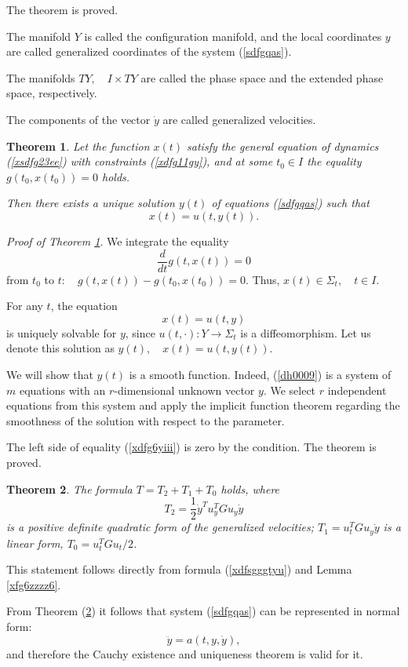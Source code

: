 \documentclass[reqno,12pt]{amsproc}
\newtheorem{theo}{Theorem}
\begin{document}
The theorem is proved.

The manifold $Y$ is called the configuration manifold, and the local coordinates $y$ are called generalized coordinates of the system (\ref{sdfgqas}).

The manifolds $TY,\quad I\times TY$ are called the phase space and the extended phase space, respectively.

The components of the vector $\dot y$ are called generalized velocities.




\begin{theo}\label{dfb00dd}
Let the function $x(t)$ satisfy the general equation of dynamics (\ref{xsdfg23ee}) with constraints (\ref{xdfg11gy}), and at some $t_0\in I$ the equality
$g(t_0,x(t_0))=0$ holds.

Then there exists a unique solution $y(t)$ of equations (\ref{sdfgqas}) such that $$x(t)=u(t,y(t)).$$\end{theo}
{\it Proof of Theorem \ref{dfb00dd}}.
We integrate the equality $$\frac{d}{dt}g(t,x(t))=0$$ from $t_0$ to $t:\quad g(t,x(t))-g(t_0,x(t_0))=0.$
Thus, $x(t)\in \Sigma_t,\quad t\in I$.

For any $t$, the equation \begin{equation}\label{dh0009}x(t)=u(t,y)\end{equation} is uniquely solvable for $y$, since $u(t,\cdot):Y\to\Sigma_t$ is a diffeomorphism. Let us denote this solution as $y(t),\quad x(t)=u(t,y(t))$.

We will show that $y(t)$ is a smooth function. Indeed, (\ref{dh0009}) is a system of $m$ equations with an $r$-dimensional unknown vector $y$. We select $r$ independent equations from this system and apply the implicit function theorem regarding the smoothness of the solution with respect to the parameter.


The left side of equality (\ref{xdfg6yiii}) is zero by the condition.
The theorem is proved.



\begin{theo}\label{asdf4eew}The formula
$T=T_2+T_1+T_0$ holds, where $$T_2=\frac{1}{2}\dot y^Tu_y^TGu_y\dot y$$ is a positive definite quadratic form of the generalized velocities; $T_1=u_t^TGu_y\dot y$ is a linear form, $T_0=u_t^TGu_t/2$.\end{theo}
This statement follows directly from formula (\ref{xdfsgggtyu}) and Lemma \ref{xfg6zzzz6}.

From Theorem (\ref{asdf4eew}) it follows that system (\ref{sdfgqas}) can be represented in normal form:
$$\ddot y=a(t,y,\dot y),$$ and therefore the Cauchy existence and uniqueness theorem is valid for it.
\end{document}
